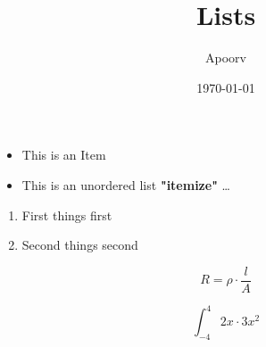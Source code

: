 \documentclass[]{article}
\title{Lists}
\author{Apoorv}
\date{\today}
\begin{document}
\maketitle
\begin{itemize}
	\item This is an Item
\item This is an unordered list \textbf{"{itemize}"} \ldots
\end{itemize}

\begin{enumerate}

	\item First things first
	\item Second things second

\end{enumerate}

$$R = \rho\cdot \frac{\textit{l}}{\textit{A}}$$

$$ \int^4_{-4} 2x\cdot3x^2 $$
\end{document}
